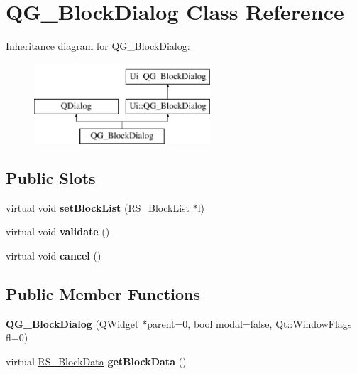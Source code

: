 \hypertarget{classQG__BlockDialog}{\section{Q\-G\-\_\-\-Block\-Dialog Class Reference}
\label{classQG__BlockDialog}
}
Inheritance diagram for Q\-G\-\_\-\-Block\-Dialog\-:\begin{figure}[H]
\begin{center}
\leavevmode
\includegraphics[height=3.000000cm]{classQG__BlockDialog}
\end{center}
\end{figure}
\subsection*{Public Slots}
\begin{DoxyCompactItemize}
\item 
\hypertarget{classQG__BlockDialog_acbe7123e44dd18c5e5ea40b7c0ea744f}{virtual void {\bfseries set\-Block\-List} (\hyperlink{classRS__BlockList}{R\-S\-\_\-\-Block\-List} $\ast$l)}\label{classQG__BlockDialog_acbe7123e44dd18c5e5ea40b7c0ea744f}

\item 
\hypertarget{classQG__BlockDialog_a89c7785255f44577f8c0c7588d94eaa8}{virtual void {\bfseries validate} ()}\label{classQG__BlockDialog_a89c7785255f44577f8c0c7588d94eaa8}

\item 
\hypertarget{classQG__BlockDialog_a1a87e2d5c2559fbb56f4453961d0a9d5}{virtual void {\bfseries cancel} ()}\label{classQG__BlockDialog_a1a87e2d5c2559fbb56f4453961d0a9d5}

\end{DoxyCompactItemize}
\subsection*{Public Member Functions}
\begin{DoxyCompactItemize}
\item 
\hypertarget{classQG__BlockDialog_a1671a00319224068d0081f5d8739f58d}{{\bfseries Q\-G\-\_\-\-Block\-Dialog} (Q\-Widget $\ast$parent=0, bool modal=false, Qt\-::\-Window\-Flags fl=0)}\label{classQG__BlockDialog_a1671a00319224068d0081f5d8739f58d}

\item 
\hypertarget{classQG__BlockDialog_a16bbe1aa631a0bc7160d85afd3795292}{virtual \hyperlink{classRS__BlockData}{R\-S\-\_\-\-Block\-Data} {\bfseries get\-Block\-Data} ()}\label{classQG__BlockDialog_a16bbe1aa631a0bc7160d85afd3795292}

\end{DoxyCompactItemize}
